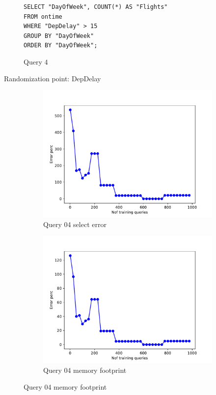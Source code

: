 \begin{figure}[t]
\begin{lstlisting}
SELECT "DayOfWeek", COUNT(*) AS "Flights"
FROM ontime
WHERE "DepDelay" > 15
GROUP BY "DayOfWeek"
ORDER BY "DayOfWeek";
\end{lstlisting}
  \caption{Query 4}
  \label{sel:sql4}
\end{figure}
Randomization point: DepDelay

\begin{figure}[t!]
  \begin{subfigure}[t]{0.5\textwidth}
    \includegraphics[scale=0.4]{figs/airtraffic/airtraffic_sel04_error.pdf}
    \caption{Query 04 select error}
    \label{fig:sel19}
  \end{subfigure}
  \begin{subfigure}[t]{0.5\textwidth}
    \includegraphics[scale=0.4]{figs/airtraffic/airtraffic_q04_memerror.pdf}
    \caption{Query 04 memory footprint}
    \label{fig:sel19}
   \end{subfigure}
\end{figure}

